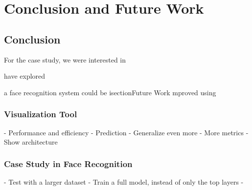 
\chapter{Conclusion and Future Work}

\section{Conclusion}





For the case study, we were interested in 

have explored 

\how a face recognition system could be isection{Future Work}
mproved using 
\subsection{Visualization Tool}

- Performance and efficiency
- Prediction
- Generalize even more
- More metrics
- Show architecture

\subsection{Case Study in Face Recognition}

- Test with a larger dataset %
- Train a full model, instead of only the top layers
- 

\cleardoublepage